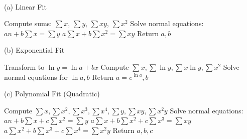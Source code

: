 \\{(a) Linear Fit}
\begin{algorithm}[H]
\caption{Linear Curve Fit $y=a+bx$}
\begin{algorithmic}[1]
\STATE Compute sums: $\sum x$, $\sum y$, $\sum xy$, $\sum x^2$
\STATE Solve normal equations:
\STATE $a n + b \sum x = \sum y$
\STATE $a \sum x + b \sum x^2 = \sum xy$
\STATE Return $a, b$
\end{algorithmic}
\end{algorithm}
{(b) Exponential Fit}
\begin{algorithm}[H]
\caption{Exponential Fit $y = ae^{bx}$}
\begin{algorithmic}[1]
\STATE Transform to $\ln y = \ln a + bx$
\STATE Compute $\sum x, \sum \ln y, \sum x \ln y, \sum x^2$
\STATE Solve normal equations for $\ln a, b$
\STATE Return $a = e^{\ln a}, b$
\end{algorithmic}
\end{algorithm}
{(c) Polynomial Fit (Quadratic)}
\begin{algorithm}[H]
\caption{Quadratic Fit $y = a+bx+cx^2$}
\begin{algorithmic}[1]
\STATE Compute $\sum x, \sum x^2, \sum x^3, \sum x^4, \sum y, \sum xy, \sum x^2y$
\STATE Solve normal equations:
\STATE $a n + b \sum x + c \sum x^2 = \sum y$
\STATE $a \sum x + b \sum x^2 + c \sum x^3 = \sum xy$
\STATE $a \sum x^2 + b \sum x^3 + c \sum x^4 = \sum x^2y$
\STATE Return $a, b, c$
\end{algorithmic}
\end{algorithm}
